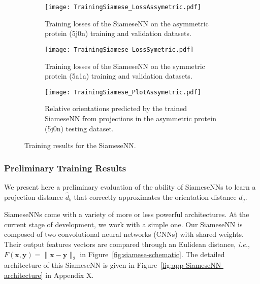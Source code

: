 \begin{figure}[t!]
    \centering
    \begin{subfigure}[t]{0.4\textwidth}
        \texttt{[image: TrainingSiamese\_LossAssymetric.pdf]}
        \caption{Training losses of the SiameseNN on the asymmetric protein (5j0n) training and validation datasets.} 
        \label{fig:losses-siamese-assym}
    \end{subfigure} \quad \quad
    \begin{subfigure}[t]{0.4\textwidth}
        \texttt{[image: TrainingSiamese\_LossSymetric.pdf]}
        \caption{Training losses of the SiameseNN on the symmetric protein (5a1a) training and validation datasets.} 
        \label{fig:losses-siamese-sym}
    \end{subfigure} \vspace{0.45cm}
    
    \begin{subfigure}[t]{0.4\textwidth}
        \texttt{[image: TrainingSiamese\_PlotAssymetric.pdf]}
        \caption{Relative orientations predicted by the trained SiameseNN from projections in the asymmetric protein (5j0n) testing dataset. } 
        \label{fig:learned-distance-siamese}
    \end{subfigure} \vspace{0.35cm}
    \caption{Training results for the SiameseNN.} 
    \label{fig:losses-siamese}
\end{figure}


\subsubsection{Preliminary Training Results}

We present here a preliminary evaluation of the ability of SiameseNNs to learn a projection distance $\widehat{d}_b$ that correctly approximates the orientation distance $d_q$. 

SiameseNNs come with a variety of more or less powerful architectures. At the current stage of development, we work with a simple one. Our SiameseNN is composed of two convolutional neural networks (CNNs) with shared weights. Their output features vectors are compared through an Eulidean distance, \textit{i.e.}, $F(\mathbf{x},\mathbf{y})=\lVert \mathbf{x}-\mathbf{y}\rVert_2$ in Figure~\ref{fig:siamese-schematic}. The detailed architecture of this SiameseNN is given in Figure~\ref{fig:app-SiameseNN-architecture} in Appendix X.

